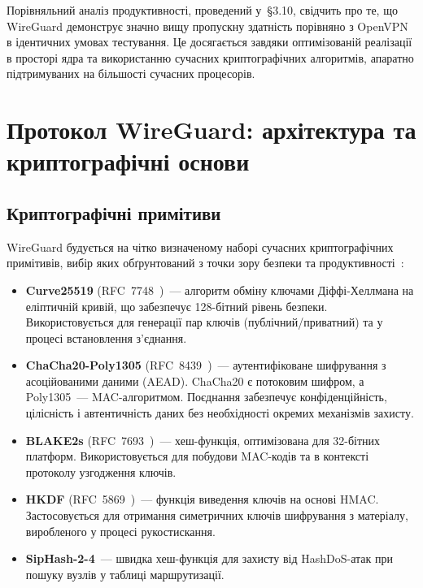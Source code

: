 Порівняльний аналіз продуктивності, проведений у~§3.10, свідчить
про те, що WireGuard демонструє значно вищу пропускну здатність порівняно
з OpenVPN в ідентичних умовах тестування. Це досягається завдяки оптимізованій
реалізації в просторі ядра та використанню сучасних криптографічних алгоритмів,
апаратно підтримуваних на більшості сучасних процесорів.

\section{Протокол WireGuard: архітектура та криптографічні основи}

\subsection{Криптографічні примітиви}

WireGuard будується на чітко визначеному наборі сучасних криптографічних
примітивів, вибір яких обґрунтований з точки зору безпеки та продуктивності~\cite{donenfeld2017wireguard}:

\begin{itemize}
  \item \textbf{Curve25519} (RFC~7748~\cite{rfc7748})~--- алгоритм обміну
        ключами Діффі-Хеллмана на еліптичній кривій, що забезпечує 128-бітний
        рівень безпеки. Використовується для генерації пар ключів (публічний/приватний)
        та у процесі встановлення з'єднання.

  \item \textbf{ChaCha20-Poly1305} (RFC~8439~\cite{rfc8439})~--- аутентифіковане
        шифрування з асоційованими даними (AEAD). ChaCha20 є потоковим шифром,
        а Poly1305~--- MAC-алгоритмом. Поєднання забезпечує конфіденційність,
        цілісність і автентичність даних без необхідності окремих механізмів захисту.

  \item \textbf{BLAKE2s} (RFC~7693~\cite{rfc7693})~--- хеш-функція, оптимізована
        для 32-бітних платформ. Використовується для побудови MAC-кодів та в
        контексті протоколу узгодження ключів.

  \item \textbf{HKDF} (RFC~5869~\cite{rfc5869})~--- функція виведення ключів
        на основі HMAC. Застосовується для отримання симетричних ключів шифрування
        з матеріалу, виробленого у процесі рукостискання.

  \item \textbf{SipHash-2-4}~--- швидка хеш-функція для захисту від HashDoS-атак
        при пошуку вузлів у таблиці маршрутизації.
\end{itemize}

